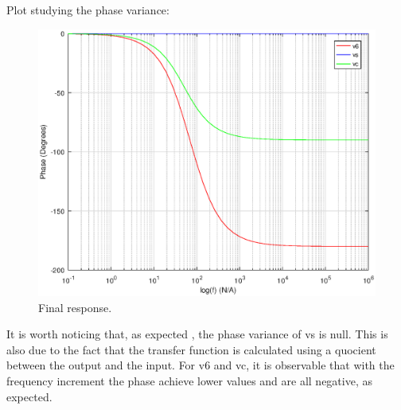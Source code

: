 Plot studying the phase variance:\par
\begin{figure}[H] \centering
\includegraphics[width=0.6\linewidth]{ph6SC.eps}
\caption{Final response.}
\label{fig:point62}
\end{figure}
It is worth noticing that, as expected , the phase variance of vs is null. This is also due to the fact that the transfer function is calculated using a quocient between the output and the input.
For v6 and vc, it is observable that with the frequency increment the phase achieve lower values and are all negative, as expected. 
